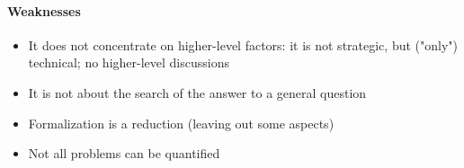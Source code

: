 \paragraph{Weaknesses}

\begin{itemize}
    \item It does not concentrate on higher-level factors: it is not strategic,
        but ("only") technical; no higher-level discussions
    \item It is not about the search of the answer to a general question
    \item Formalization is a reduction (leaving out some aspects)
    \item Not all problems can be quantified
\end{itemize}


